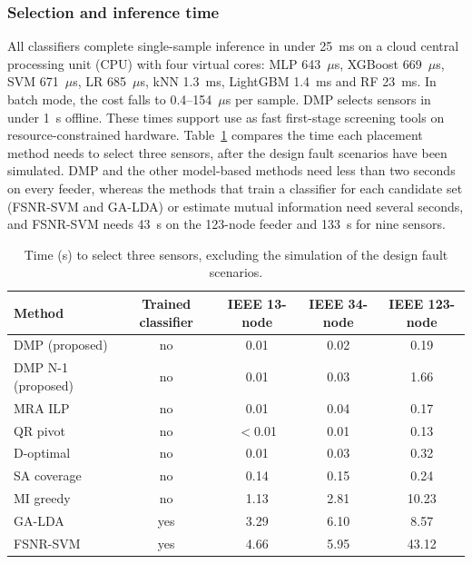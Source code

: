 \documentclass[11pt]{article}
\newenvironment{nw}{}{}
\newcommand{\hlnew}[1]{#1}
\begin{document}
\subsubsection{Selection and inference time}\label{subsec5_9}

\begin{nw}
All classifiers complete single-sample inference in under 25~ms on a cloud central processing unit (CPU) with four virtual cores: MLP 643~$\mu$s, XGBoost 669~$\mu$s, SVM 671~$\mu$s, LR 685~$\mu$s, kNN 1.3~ms, LightGBM 1.4~ms and RF 23~ms. In batch mode, the cost falls to 0.4--154~$\mu$s per sample. DMP selects sensors in under 1~s offline. These times support use as fast first-stage screening tools on resource-constrained hardware. Table~\ref{tab_cost} compares the time each placement method needs to select three sensors, after the design fault scenarios have been simulated. DMP and the other model-based methods need less than two seconds on every feeder, whereas the methods that train a classifier for each candidate set (FSNR-SVM and GA-LDA) or estimate mutual information need several seconds, and FSNR-SVM needs 43~s on the 123-node feeder and 133~s for nine sensors.
\end{nw}

\begin{table}[!htbp]
\centering
\caption{\hlnew{Time (s) to select three sensors, excluding the simulation of the design fault scenarios.}}\label{tab_cost}
\small
\begin{tabular}{lcccc}
\toprule
Method & Trained classifier & IEEE 13-node & IEEE 34-node & IEEE 123-node\\
\midrule
DMP (proposed) & no & 0.01 & 0.02 & 0.19\\
DMP N-1 (proposed) & no & 0.01 & 0.03 & 1.66\\
MRA ILP & no & 0.01 & 0.04 & 0.17\\
QR pivot & no & $<$0.01 & 0.01 & 0.13\\
D-optimal & no & 0.01 & 0.03 & 0.32\\
SA coverage & no & 0.14 & 0.15 & 0.24\\
MI greedy & no & 1.13 & 2.81 & 10.23\\
GA-LDA & yes & 3.29 & 6.10 & 8.57\\
FSNR-SVM & yes & 4.66 & 5.95 & 43.12\\
\bottomrule
\end{tabular}
\end{table}
\begin{nw}
\end{nw}
\end{document}
